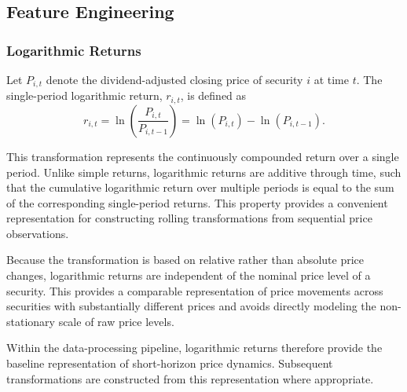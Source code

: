 

\subsection{Feature Engineering}
\label{feature_engineering}
\subsubsection{Logarithmic Returns}
Let $P_{i,t}$ denote the dividend-adjusted closing price of security $i$ at time $t$. The single-period logarithmic return, $r_{i,t}$, is defined as
\begin{equation}
	r_{i,t}=\ln\left(\frac{P_{i,t}}{P_{i,t-1}}\right)=\ln(P_{i,t})-\ln(P_{i,t-1}).
\end{equation}

This transformation represents the continuously compounded return over a single period. Unlike simple returns, logarithmic returns are additive through time, such that the cumulative logarithmic return over multiple periods is equal to the sum of the corresponding single-period returns. This property provides a convenient representation for constructing rolling transformations from sequential price observations.

\medskip

Because the transformation is based on relative rather than absolute price changes, logarithmic returns are independent of the nominal price level of a security. This provides a comparable representation of price movements across securities with substantially different prices and avoids directly modeling the non-stationary scale of raw price levels.

\medskip

Within the data-processing pipeline, logarithmic returns therefore provide the baseline representation of short-horizon price dynamics. Subsequent transformations are constructed from this representation where appropriate.

